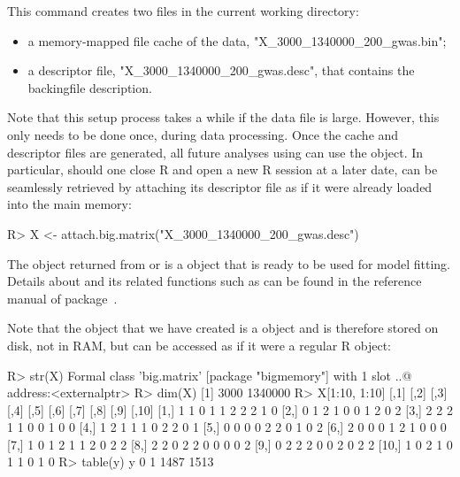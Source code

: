 This command creates two files in the current working directory: 
\begin{itemize}
\item a memory-mapped file cache of the data, "X\_3000\_1340000\_200\_gwas.bin"; 
\item a descriptor file, "X\_3000\_1340000\_200\_gwas.desc", that contains the backingfile description.
\end{itemize}

Note that this setup process takes a while if the data file is large. However, this only needs to be done once, during data processing.  Once the cache and descriptor files are generated, all future analyses using  can use the  object.  In particular, should one close R and open a new R session at a later date,  can be seamlessly retrieved by attaching its descriptor file as if it were already loaded into the main memory:

\begin{example}
R> X <- attach.big.matrix("X_3000_1340000_200_gwas.desc")
\end{example}

The object  returned from  or  is a  object that is ready to be used for model fitting. Details about  and its related functions such as  can be found in the reference manual of  package~\citep{kane2013scalable}.

Note that the object  that we have created is a  object and is therefore stored on disk, not in RAM, but can be accessed as if it were a regular R object:
\begin{example}
R> str(X)
Formal class 'big.matrix' [package "bigmemory"] with 1 slot
  ..@ address:<externalptr> 
R> dim(X)
[1]    3000 1340000
R> X[1:10, 1:10]
      [,1] [,2] [,3] [,4] [,5] [,6] [,7] [,8] [,9] [,10]
 [1,]    1    1    0    1    1    2    2    2    1     0
 [2,]    0    1    2    1    0    0    1    2    0     2
 [3,]    2    2    2    1    1    0    0    1    0     0
 [4,]    1    2    1    1    1    0    2    2    0     1
 [5,]    0    0    0    0    2    2    0    1    0     2
 [6,]    2    0    0    0    1    2    1    0    0     0
 [7,]    1    0    1    2    1    1    2    0    2     2
 [8,]    2    2    0    2    2    0    0    0    0     2
 [9,]    0    2    2    2    0    0    2    0    2     2
[10,]    1    0    2    1    0    1    1    0    1     0
R> table(y)
y
   0    1 
1487 1513 
\end{example}

